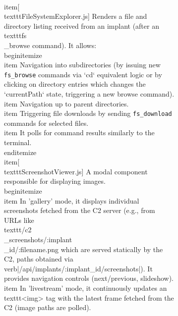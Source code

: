 \begin{description}
\begin{figure}[H]
\begin{figure}[H]
    \\item[\\texttt{FileSystemExplorer.js}] Renders a file and directory listing received from an implant (after an \\texttt{fs\\_browse} command). It allows:
        \\begin{itemize}
            \\item Navigation into subdirectories (by issuing new \texttt{fs\_browse} commands via `cd` equivalent logic or by clicking on directory entries which changes the `currentPath` state, triggering a new browse command).
            \\item Navigation up to parent directories.
            \\item Triggering file downloads by sending \texttt{fs\_download} commands for selected files.
            \\item It polls for command results similarly to the terminal.
        \\end{itemize}
    \\item[\\texttt{ScreenshotViewer.js}] A modal component responsible for displaying images.
        \\begin{itemize}
            \\item In 'gallery' mode, it displays individual screenshots fetched from the C2 server (e.g., from URLs like \\texttt{/c2\\_screenshots/:implant\\_id/:filename.png} which are served statically by the C2, paths obtained via \\verb|/api/implants/:implant_id/screenshots|). It provides navigation controls (next/previous, slideshow).
            \\item In 'livestream' mode, it continuously updates an \\texttt{<img>} tag with the latest frame fetched from the C2 (image paths are polled).


\end{figure}
\end{figure}
\end{description}
